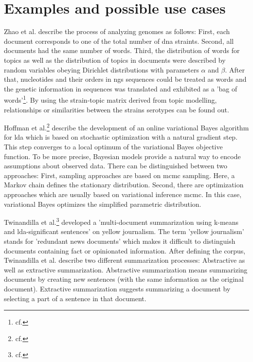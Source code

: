 \section{Examples and possible use cases}\label{lda_examples}

Zhao et al. describe the process of analyzing genomes as follows: First, each document corresponds to one of the total number of \gls{dna} straints. Second, all documents had the same number of words. Third, the distribution of words for topics as well as the distribution of topics in documents were described by random variables obeying Dirichlet distributions with parameters $\alpha$ and $\beta$. After that, nucleotides and their orders in \gls{ngs} sequences could be treated as words and the genetic information in sequences was translated and exhibited as a 'bag of words'\footnote{cf.\autocite{zhao_2016}}. By using the strain-topic matrix derived from topic modelling, relationships or similarities between the strains serotypes can be found out. 

Hoffman et al.\footnote{cf.\autocite{hoffman_2010}} describe the development of an online variational Bayes algorithm for \gls{lda} which is based on stochastic optimization with a natural gradient step. This step converges to a local optimum of the variational Bayes objective function.
To be more precise, Bayesian models provide a natural way to encode assumptions about observed data.
There can be distinguished between two approaches: First, sampling approaches are based on \gls{mcmc} sampling. Here, a Markov chain defines the stationary distribution.
Second, there are optimization approaches which are usually based on variational inference \gls{mcmc}. In this case, variational Bayes optimizes the simplified parametric distribution.

Twinandilla et al.\footnote{cf.\autocite{twinandilla_2018}} developed a 'multi-document summarization using k-means and \gls{lda}-significant sentences' on yellow journalism. The term 'yellow journalism' stands for 'redundant news documents' which makes it difficult to distinguish documents containing fact or opinionated information. After defining the corpus, Twinandilla et al. describe two different summarization processes: Abstractive as well as extractive summarization. Abstractive summarization means summarizing documents by creating new sentences (with the same information as the original document). Extractive summarization suggests summarizing a document by selecting a part of a sentence in that document.

